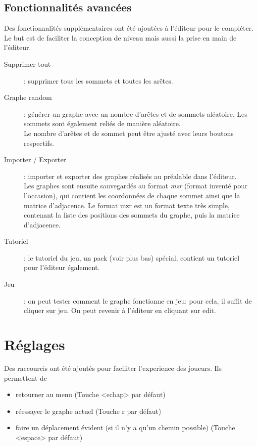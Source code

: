 \documentclass[12pt]{article}
\begin{document}
\subsection{Fonctionnalités avancées}
Des fonctionnalités supplémentaires ont été ajoutées à l'éditeur pour le compléter.\\
Le but est de faciliter la conception de niveau mais aussi la prise en main de l'éditeur.
\begin{description}
    \item[Supprimer tout]: supprimer tous les sommets et toutes les arêtes.

    \item[Graphe random]: générer un graphe avec un nombre d'arêtes et de sommets aléatoire. Les sommets sont également reliés de manière aléatoire.\\
    Le nombre d'arêtes et de sommet peut être ajusté avec leurs boutons respectifs.

    \item[Importer / Exporter]: importer et exporter des graphes réalisés au préalable dans l'éditeur.\\
    Les graphes sont ensuite sauvegardés au format \textit{mzr} (format inventé pour l'occasion), qui contient les coordonnées de chaque sommet ainsi que la matrice d'adjacence.
    Le format mzr est un format texte très simple, contenant la liste des positions des sommets du graphe, puis la matrice d'adjacence.

    \item[Tutoriel]: le tutoriel du jeu, un pack (voir plus bas) spécial, contient un tutoriel pour l'éditeur également.

    \item[Jeu]: on peut tester comment le graphe fonctionne en jeu: pour cela, il suffit de cliquer sur jeu. On peut revenir à l'éditeur en cliquant sur edit.
\end{description}

\section{Réglages}

Des raccourcis ont été ajoutés pour faciliter l'experience des joueurs. Ils permettent de
\begin{itemize}
    \item retourner au menu (Touche <echap> par défaut)
    \item réessayer le graphe actuel (Touche r par défaut)
    \item faire un déplacement évident (si il n'y a qu'un chemin possible) (Touche <espace> par défaut)
\end{itemize}
\end{document}
